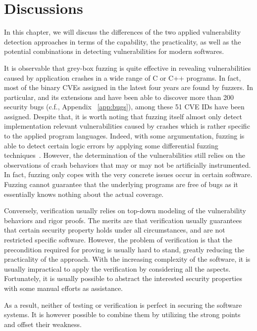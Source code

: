 
\chapter{Discussions} \label{ch:discuss}
In this chapter, we will discuss the differences of the two applied vulnerability detection approaches in terms of the capability, the practicality, as well as the potential combinations in detecting vulnerabilities for modern softwares.

It is observable that grey-box fuzzing is quite effective in revealing vulnerabilities caused by application crashes in a wide range of C or C++ programs. In fact, most of the binary CVEs assigned in the latest four years are found by fuzzers. In particular, \FOT and its extensions \dFOT and \mtfuzz have been able to discover more than 200 security bugs (c.f., Appendix ~\ref{app:bugs}), among these 51 CVE IDs have been assigned. Despite that, it is worth noting that fuzzing itself almost only detect implementation relevant vulnerabilities caused by crashes which is rather specific to the applied program languages. Indeed, with some argumentation, fuzzing is able to detect certain logic errors by applying some differential fuzzing techniques~\cite{nezha}. However, the determination of the vulnerabilities still relies on the observations of crash behaviors that may or may not be artificially instrumented. In fact, fuzzing only copes with the very concrete issues occur in certain software. Fuzzing cannot guarantee that the underlying programs are free of bugs as it essentially knows nothing about the actual coverage.

Conversely, verification usually relies on top-down modeling of the vulnerability behaviors and rigor proofs. The merits are that verification usually guarantees that certain security property holds under all circumstances, and are not restricted specific software. However, the problem of verification is that the precondition required for proving is usually hard to stand, greatly reducing the practicality of the approach. With the increasing complexity of the software, it is usually impractical to apply the verification by considering all the aspects. Fortunately, it is usually possible to abstract the interested security properties with some manual efforts as assistance.

As a result, neither of testing or verification is perfect in securing the software systems. It is however possible to combine them by utilizing the strong points and offset their weakness.